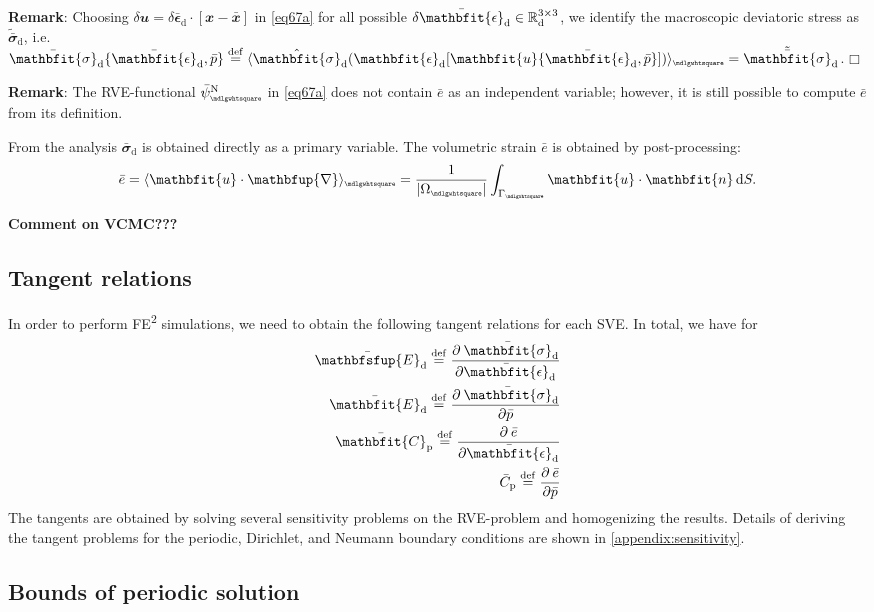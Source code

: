 \documentclass[12pt,a4paper]{article}
\renewcommand{\ta}[1]{\mathbfit{#1}}
\renewcommand{\ts}[1]{\mathbfit{#1}}
\renewcommand{\tf}[1]{\mathbfsfup{#1}}
\renewcommand{\diff}{\mathbfup{\nabla}}
\renewcommand{\Box}{\mdlgwhtsquare}
\DeclarePairedDelimiter{\homgen}{\langle}{\rangle_\rve}
\renewcommand{\dev}{\mathrm{d}}
\newcommand{\volume}{|\Omega_\rve|}
\newcommand{\ded}{\mathrm{d}}
\newcommand{\dep}{\mathrm{p}}
\newcommand{\rve}{
  {\mathchoice
   {\mbox{\scalebox{0.67}{$\Box$}}}
   {\mbox{\scalebox{0.67}{$\Box$}}}
   {\mbox{\scalebox{0.5}{$\Box$}}}
   {\mbox{\scalebox{0.375}{$\Box$}}}
  }
}
\begin{document}
\textbf{Remark}: Choosing $\delta\ta{u}=\delta\bar{\ts\epsilon}_\dev\cdot[\ta{x}-\bar{\ta{x}}]$ in \cref{eq67a} for all possible $\delta\bar{\ts\epsilon}_\dev\in\set{R}^{3\times 3}_\dev$, we identify the macroscopic deviatoric stress as $\tilde{\bar{\ts\sigma}}_\dev$, i.e.\ $\bar{\ts\sigma}_\dev\{\bar{\ts\epsilon}_\dev,\bar{p}\} \defeq
\homgen{ \hat{\ts{\sigma}}_\dev(\ts{\epsilon}_\dev[\ta{u}\{\bar{\ts\epsilon}_\dev,\bar{p}\}]) } = \tilde{\bar{\ts\sigma}}_\dev$. $\Box$

\textbf{Remark}: The RVE-functional $\bar{\psi}_\rve^\Neumann$ in \cref{eq67a} does not contain $\bar{e}$ as an independent variable; however, it is still possible to compute $\bar{e}$ from its definition.

From the analysis $\bar{\ts\sigma}_\dev$ is obtained directly as a primary variable.
The volumetric strain $\bar{e}$ is obtained by post-processing:
\begin{align}
 \bar{e} = \homgen{\ta u\cdot\diff} = \frac{1}{\volume} \int_{\Gamma_\rve} \ta u \cdot \ta n\dif S.
\end{align}

\textbf{Comment on VCMC???} 


\subsection{Tangent relations}
In order to perform FE\textsuperscript{2} simulations, we need to obtain the following tangent relations for each SVE.
In total, we have for 
\begin{subequations}
\label{eq:macro_tangents}
\begin{align}
 \bar{\tf E}_\ded \defeq \pd{\bar{\ts\sigma}_\dev}{\bar{\ts\epsilon}_\dev}\\
 \bar{\ts E}_\ded \defeq \pd{\bar{\ts\sigma}_\dev}{\bar{p}}\\
 \bar{\ts C}_\dep \defeq \pd{\bar{e}}{\bar{\ts\epsilon}_\dev}\\
 \bar{C}_\dep \defeq \pd{\bar{e}}{\bar{p}}
\end{align}
\end{subequations}
The tangents are obtained by solving several sensitivity problems on the RVE-problem and homogenizing the results.
Details of deriving the tangent problems for the periodic, Dirichlet, and Neumann boundary conditions are shown in \cref{appendix:sensitivity}.




\subsection{Bounds of periodic solution}
\end{document}
